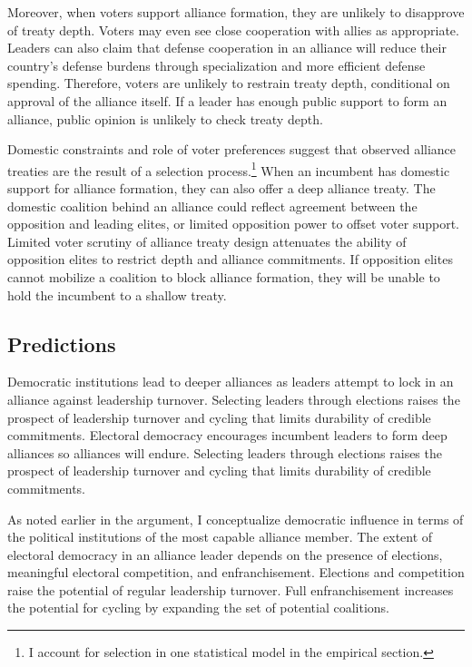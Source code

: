 \documentclass[12pt]{article}
\begin{document}
Moreover, when voters support alliance formation, they are unlikely to disapprove of treaty depth.
Voters may even see close cooperation with allies as appropriate. 
Leaders can also claim that defense cooperation in an alliance will reduce their country's defense burdens through specialization and more efficient defense spending.  
Therefore, voters are unlikely to restrain treaty depth, conditional on approval of the alliance itself. 
If a leader has enough public support to form an alliance, public opinion is unlikely to check treaty depth. 


Domestic constraints and role of voter preferences suggest that observed alliance treaties are the result of a selection process.\footnote{I account for selection in one statistical model in the empirical section.} 
When an incumbent has domestic support for alliance formation, they can also offer a deep alliance treaty. 
The domestic coalition behind an alliance could reflect agreement between the opposition and leading elites, or limited opposition power to offset voter support. 
Limited voter scrutiny of alliance treaty design attenuates the ability of opposition elites to restrict depth and alliance commitments.
If opposition elites cannot mobilize a coalition to block alliance formation, they will be unable to hold the incumbent to a shallow treaty. 



\subsection{Predictions}

Democratic institutions lead to deeper alliances as leaders attempt to lock in an alliance against leadership turnover. 
Selecting leaders through elections raises the prospect of leadership turnover and cycling that limits durability of credible commitments. 
Electoral democracy encourages incumbent leaders to form deep alliances so alliances will endure.
Selecting leaders through elections raises the prospect of leadership turnover and cycling that limits durability of credible commitments. 


As noted earlier in the argument, I conceptualize democratic influence in terms of the political institutions of the most capable alliance member.
The extent of electoral democracy in an alliance leader depends on the presence of elections, meaningful electoral competition, and enfranchisement. 
Elections and competition raise the potential of regular leadership turnover. 
Full enfranchisement increases the potential for cycling by expanding the set of potential coalitions. 
\end{document}
